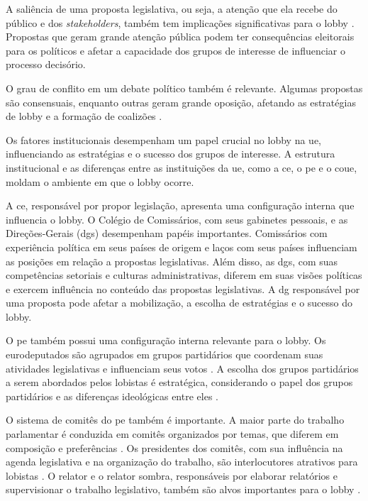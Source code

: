     A saliência de uma proposta legislativa, ou seja, a atenção que ela recebe do público e dos \textit{stakeholders}, também tem implicações significativas para o lobby \cite{mahoney_lobbying_2007, mahoney2008brussels}. Propostas que geram grande atenção pública podem ter consequências eleitorais para os políticos e afetar a capacidade dos grupos de interesse de influenciar o processo decisório. 

    O grau de conflito em um debate político também é relevante. Algumas propostas são consensuais, enquanto outras geram grande oposição, afetando as estratégias de lobby e a formação de coalizões \cite{kluver_informational_2012, mahoney_lobbying_2007, mahoney2008brussels}.

Os fatores institucionais desempenham um papel crucial no lobby na \acrshort{ue}, influenciando as estratégias e o sucesso dos grupos de interesse. A estrutura institucional e as diferenças entre as instituições da \acrshort{ue}, como a \acrshort{ce}, o \acrshort{pe} e o \acrshort{coue}, moldam o ambiente em que o lobby ocorre.

    A \acrshort{ce}, responsável por propor legislação, apresenta uma configuração interna que influencia o lobby. O Colégio de Comissários, com seus gabinetes pessoais, e as Direções-Gerais (\acrshort{dg}s) desempenham papéis importantes. Comissários com experiência política em seus países de origem e laços com seus países influenciam as posições em relação a propostas legislativas. Além disso, as \acrshort{dg}s, com suas competências setoriais e culturas administrativas, diferem em suas visões políticas e exercem influência no conteúdo das propostas legislativas. A \acrshort{dg} responsável por uma proposta pode afetar a mobilização, a escolha de estratégias e o sucesso do lobby.

    O \acrshort{pe} também possui uma configuração interna relevante para o lobby. Os eurodeputados são agrupados em grupos partidários que coordenam suas atividades legislativas e influenciam seus votos \cite{Hix2002}. A escolha dos grupos partidários a serem abordados pelos lobistas é estratégica, considerando o papel dos grupos partidários e as diferenças ideológicas entre eles \cite{marshall2015explaining}.

    O sistema de comitês do \acrshort{pe} também é importante. A maior parte do trabalho parlamentar é conduzida em comitês organizados por temas, que diferem em composição e preferências \cite{yordanova2009rationale}. Os presidentes dos comitês, com sua influência na agenda legislativa e na organização do trabalho, são interlocutores atrativos para lobistas \cite{marshall2015explaining}. O relator e o relator sombra, responsáveis por elaborar relatórios e supervisionar o trabalho legislativo, também são alvos importantes para o lobby \cite{yordanova2009rationale}.

